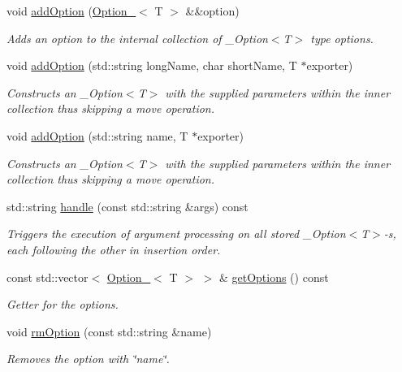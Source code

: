 \begin{DoxyCompactItemize}
    \item
    void \mbox{\hyperlink{class_info_parse_1_1_option_handler___a665e15d0113596904ed969b1d1c9be4a}{add\+Option}} (\mbox{\hyperlink{class_info_parse_1_1_option__}{Option\+\_\+}}$<$ T $>$ \&\&option)
    \begin{DoxyCompactList}
        \small\item\em Adds an option to the internal collection of \+\_\+\+Option$<$\+T$>$ type options.
    \end{DoxyCompactList}\item
    void \mbox{\hyperlink{class_info_parse_1_1_option_handler___aa9ce101627efa197aeff99662c53ee41}{add\+Option}} (std\+::string long\+Name, char short\+Name, T $\ast$exporter)
    \begin{DoxyCompactList}
        \small\item\em Constructs an \+\_\+\+Option$<$\+T$>$ with the supplied parameters within the inner collection thus skipping a move operation.
    \end{DoxyCompactList}\item
    void \mbox{\hyperlink{class_info_parse_1_1_option_handler___a3037ab35506464ce2a94ecfc6accf003}{add\+Option}} (std\+::string name, T $\ast$exporter)
    \begin{DoxyCompactList}
        \small\item\em Constructs an \+\_\+\+Option$<$\+T$>$ with the supplied parameters within the inner collection thus skipping a move operation.
    \end{DoxyCompactList}\item
    std\+::string \mbox{\hyperlink{class_info_parse_1_1_option_handler___a79febb4c9edeb20e7ea0336265055c82}{handle}} (const std\+::string \&args) const
    \begin{DoxyCompactList}
        \small\item\em Triggers the execution of argument processing on all stored \+\_\+\+Option$<$\+T$>$-\/s, each following the other in insertion order.
    \end{DoxyCompactList}\item
    const std\+::vector$<$ \mbox{\hyperlink{class_info_parse_1_1_option__}{Option\+\_\+}}$<$ T $>$ $>$ \& \mbox{\hyperlink{class_info_parse_1_1_option_handler___aaa1be80887897051eb5dbad952e97d3a}{get\+Options}} () const
    \begin{DoxyCompactList}
        \small\item\em Getter for the options.
    \end{DoxyCompactList}\item
    void \mbox{\hyperlink{class_info_parse_1_1_option_handler___afa03bac484a7cecbd5e868e88e6c56b4}{rm\+Option}} (const std\+::string \&name)
    \begin{DoxyCompactList}
        \small\item\em Removes the option with \char`\"{}name\char`\"{}.
    \end{DoxyCompactList}
\end{DoxyCompactItemize}



